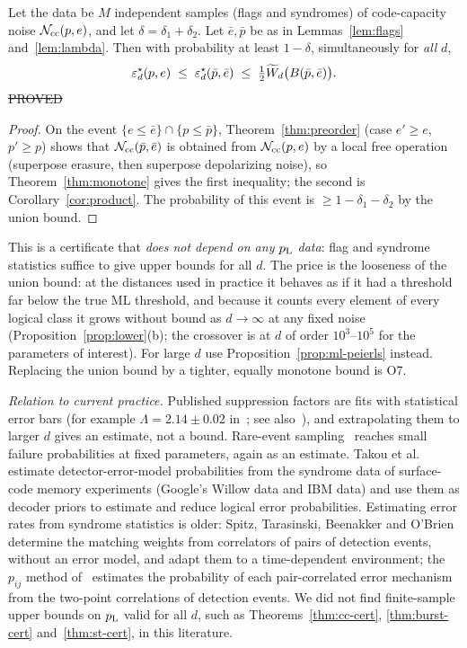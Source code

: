 \begin{theorem}\label{thm:cc-cert}
Let the data be $M$ independent samples (flags and syndromes) of code-capacity noise $\mathcal{N}_{\rm cc}(p,e)$, and let $\delta=\delta_1+\delta_2$.
Let $\bar e,\bar p$ be as in Lemmas~\ref{lem:flags} and~\ref{lem:lambda}. Then with probability at least $1-\delta$, simultaneously for \emph{all} $d$,
\[
\varepsilon^{\star}_d(p,e)\;\le\;\varepsilon^{\star}_d(\bar p,\bar e)\;\le\;\tfrac12\widetilde W_d\big(B(\bar p,\bar e)\big).
\]
\hfill\st{PROVED}
\end{theorem}
\begin{proof}
On the event $\{e\le\bar e\}\cap\{p\le\bar p\}$, Theorem~\ref{thm:preorder} (case $e'\ge e$, $p'\ge p$) shows that
$\mathcal{N}_{\rm cc}(\bar p,\bar e)$ is obtained from $\mathcal{N}_{\rm cc}(p,e)$ by a local free operation (superpose erasure, then superpose depolarizing noise),
so Theorem~\ref{thm:monotone} gives the first inequality; the second is Corollary~\ref{cor:product}.
The probability of this event is $\ge1-\delta_1-\delta_2$ by the union bound.
\end{proof}

This is a certificate that \emph{does not depend on any $p_{\mathrm{L}}$ data}: flag and syndrome statistics suffice to give upper bounds for all $d$. The price is the looseness of the union bound: at the distances used in practice it behaves as if it had a threshold far below the true ML threshold, and because it counts every element of every logical class it grows without bound as $d\to\infty$ at any fixed noise (Proposition~\ref{prop:lower}(b); the crossover is at $d$ of order $10^3$--$10^5$ for the parameters of interest). For large $d$ use Proposition~\ref{prop:ml-peierls} instead. Replacing the union bound by a tighter, equally monotone bound is O7.

\noindent\emph{Relation to current practice.} Published suppression factors are fits with statistical error bars (for example $\Lambda=2.14\pm0.02$ in~\cite{Google24}; see also~\cite{Google22}), and extrapolating them to larger $d$ gives an estimate, not a bound. Rare-event sampling~\cite{BV} reaches small failure probabilities at fixed parameters, again as an estimate. Takou et al.~\cite{Takou} estimate detector-error-model probabilities from the syndrome data of surface-code memory experiments (Google's Willow data and IBM data) and use them as decoder priors to estimate and reduce logical error probabilities. Estimating error rates from syndrome statistics is older: Spitz, Tarasinski, Beenakker and O'Brien~\cite{Spitz} determine the matching weights from correlators of pairs of detection events, without an error model, and adapt them to a time-dependent environment; the $p_{ij}$ method of~\cite{Google21} estimates the probability of each pair-correlated error mechanism from the two-point correlations of detection events. We did not find finite-sample upper bounds on $p_{\mathrm{L}}$ valid for all $d$, such as Theorems~\ref{thm:cc-cert}, \ref{thm:burst-cert} and~\ref{thm:st-cert}, in this literature.

